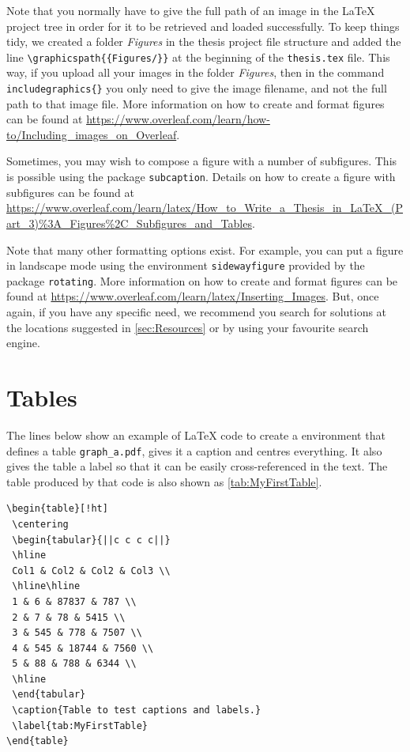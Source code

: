 \documentclass[11pt,twoside,openright]{report}
\begin{document}
Note that you normally have to give the full path of an image in the \LaTeX{} project tree in order for it to be retrieved and loaded successfully. 
To keep things tidy, we created a folder \emph{Figures} in the thesis project file structure and added the line \verb|\graphicspath{{Figures/}}| at the beginning of the \verb|thesis.tex| file. 
This way, if you upload all your images in the folder \emph{Figures}, then in the command \verb|includegraphics{}| you only need to give the image filename, and not the full path to that image file. 
More information on how to create and format figures can be found at \url{https://www.overleaf.com/learn/how-to/Including_images_on_Overleaf}.

Sometimes, you may wish to compose a figure with a number of subfigures. This is possible using the package \verb|subcaption|.
Details on how to create a figure with subfigures can be found at \url{https://www.overleaf.com/learn/latex/How_to_Write_a_Thesis_in_LaTeX_(Part_3)\%3A_Figures\%2C_Subfigures_and_Tables}.

Note that many other formatting options exist. For example, you can put a figure in landscape mode using the environment \verb|sidewayfigure| provided by the package \verb|rotating|.
More information on how to create and format figures can be found at \url{https://www.overleaf.com/learn/latex/Inserting_Images}.
But, once again, if you have any specific need, we recommend you search for solutions at the locations suggested in \cref{sec:Resources} or by using your favourite search engine.


\section{Tables}
\label{sec:tables}

The lines below show an example of \LaTeX{} code to create a  environment that defines a table \verb|graph_a.pdf|, gives it a caption and centres everything.
It also gives the table a label so that it can be easily cross-referenced in the text. The table produced by that code is also shown as \cref{tab:MyFirstTable}.

\begin{verbatim}
\begin{table}[!ht]
 \centering
 \begin{tabular}{||c c c c||} 
 \hline
 Col1 & Col2 & Col2 & Col3 \\
 \hline\hline
 1 & 6 & 87837 & 787 \\ 
 2 & 7 & 78 & 5415 \\
 3 & 545 & 778 & 7507 \\
 4 & 545 & 18744 & 7560 \\
 5 & 88 & 788 & 6344 \\
 \hline
 \end{tabular}
 \caption{Table to test captions and labels.}
 \label{tab:MyFirstTable}
\end{table}
\end{verbatim}
\end{document}
